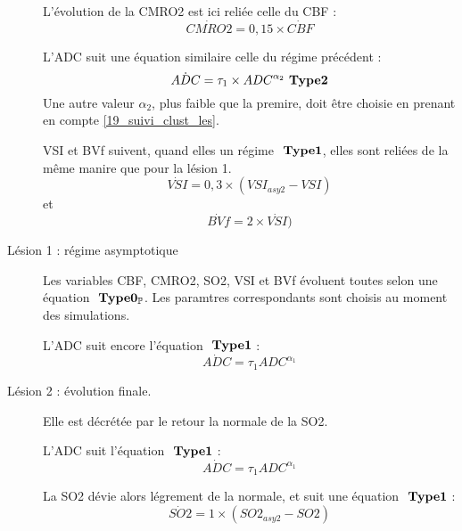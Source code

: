 \begin{description}
\par
L'\'evolution de la CMRO2 est ici reli\'ee  celle du CBF :
\begin{equation}
\dot{CMRO2}=0,15\times\dot{CBF}
\end{equation}

L'ADC suit une \'equation similaire  celle du r\'egime pr\'ec\'edent :
\begin{equation}
\dot{ADC} = \tau_1\times ADC^{\alpha_2} \ \mathbf{Type 2}
\label{adc_is_tr}
\end{equation}
Une autre valeur $\alpha_2$, plus faible que la premire, doit \^etre choisie en prenant en compte \ref{19_suivi_clust_les}.

VSI et BVf suivent, quand  elles un r\'egime $\ \mathbf{Type 1}$, elles sont reli\'ees de la m\^eme manire que pour la l\'esion 1.
\begin{equation}
\dot{VSI}=0,3\times (VSI_{asy2}-VSI)
\end{equation}
et%
\begin{equation}
\dot{BVf}=2\times\dot{VSI})
\end{equation}
%
\item[L\'esion 1 : r\'egime asymptotique] Les variables CBF, CMRO2, SO2, VSI et BVf \'evoluent toutes selon une \'equation $\ \mathbf{Type 0_{\mathbb{P}}}$. %
Les paramtres correspondants sont choisis au moment des simulations.

\par
L'ADC suit encore l'\'equation $\ \mathbf{Type 1}$ :
\begin{equation}
\dot{ADC}=\tau_1ADC^{\alpha_1}
\end{equation}
%
\item[L\'esion 2 : \'evolution finale. ] Elle est d\'ecr\'et\'ee par le retour  la normale de la SO2.
\par
L'ADC suit l'\'equation $\ \mathbf{Type 1}$ :
\begin{equation}
\dot{ADC}=\tau_1ADC^{\alpha_1}
\end{equation}

La SO2 d\'evie alors l\'egrement de la normale, et suit une \'equation $\ \mathbf{Type 1}$ :
\begin{equation}
\dot{SO2}=1\times (SO2_{asy2}-SO2)
\end{equation}


\end{description}
